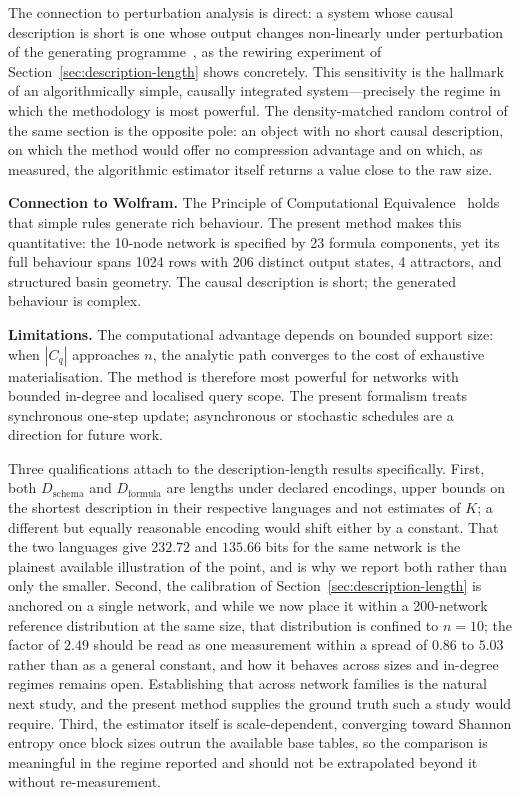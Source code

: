 \documentclass[11pt]{article}
\begin{document}
The connection to perturbation analysis is direct: a system whose causal
description is short is one whose output changes non-linearly under
perturbation of the generating programme~\cite{hernandez2019}, as the
rewiring experiment of Section~\ref{sec:description-length} shows
concretely.  This sensitivity is the hallmark of an algorithmically simple,
causally integrated system---precisely the regime in which the methodology is
most powerful.  The density-matched random control of the same section is the
opposite pole: an object with no short causal description, on which the method
would offer no compression advantage and on which, as measured, the
algorithmic estimator itself returns a value close to the raw size.

\textbf{Connection to Wolfram.}  The Principle of Computational
Equivalence~\cite{wolfram2002new} holds that simple rules generate rich
behaviour.  The present method makes this quantitative: the 10-node
network is specified by 23 formula components, yet its full behaviour spans
1024 rows with 206 distinct output states, 4 attractors, and structured
basin geometry.  The causal description is short; the generated behaviour
is complex.

\textbf{Limitations.}  The computational advantage depends on bounded
support size: when $|C_q|$ approaches $n$, the analytic path converges to
the cost of exhaustive materialisation.  The method is therefore most
powerful for networks with bounded in-degree and localised query scope.
The present formalism treats synchronous one-step update; asynchronous or
stochastic schedules are a direction for future work.

Three qualifications attach to the description-length results specifically.
First, both $D_{\mathrm{schema}}$ and $D_{\mathrm{formula}}$ are lengths under
declared encodings, upper bounds on the shortest description in their
respective languages and not estimates of $K$; a different but equally
reasonable encoding would shift either by a constant.  That the two languages
give $232.72$ and $135.66$ bits for the same network is the plainest available
illustration of the point, and is why we report both rather than only the
smaller.  Second, the calibration of
Section~\ref{sec:description-length} is anchored on a single network, and while
we now place it within a 200-network reference distribution at the same size,
that distribution is confined to $n=10$; the factor of $2.49$ should be read as
one measurement within a spread of $0.86$ to $5.03$ rather than as a general
constant, and how it behaves across sizes and in-degree regimes remains open.
Establishing that across network families is the natural next study, and
the present method supplies the ground truth such a study would require.
Third, the estimator itself is scale-dependent, converging toward Shannon
entropy once block sizes outrun the available base tables, so the comparison
is meaningful in the regime reported and should not be extrapolated beyond it
without re-measurement.
\end{document}
